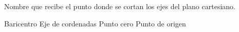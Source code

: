 
\question Nombre que recibe el punto donde se cortan los ejes del plano
          cartesiano.

  \begin{oneparchoices}
    \choice Baricentro
    \choice Eje de cordenadas
    \choice Punto cero
    \CorrectChoice Punto de origen
  \end{oneparchoices}
  \answerline[D]
